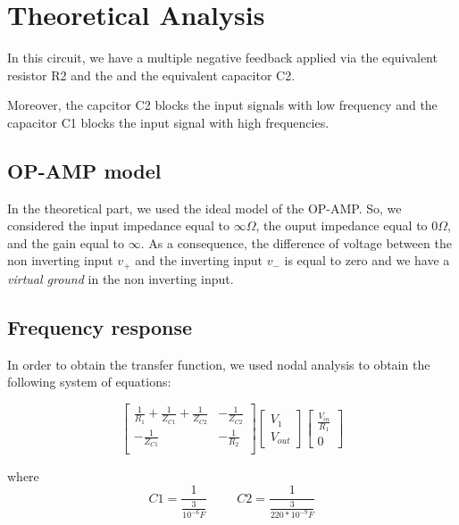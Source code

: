\section{Theoretical Analysis}
\label{sec:analysis}

In this circuit, we have a multiple negative feedback applied via the equivalent resistor R2 and the
and the equivalent capacitor C2.

Moreover, the capcitor C2 blocks the input signals with low frequency and the capacitor C1
blocks the input signal with high frequencies.

\subsection{OP-AMP model}

In the theoretical part, we used the ideal model of the OP-AMP. So, we considered the input impedance equal to $\infty \Omega$, the ouput impedance
equal to $0 \Omega$, and the gain equal to $\infty$. As a consequence, the difference of voltage between the non inverting input $v_{+}$ and the
inverting input $v_{-}$ is equal to zero and we have a \textit{virtual ground} in the non inverting input.


\subsection{Frequency response}

In order to obtain the transfer function, we used nodal analysis to obtain the following system of equations:

\[
  \begin{bmatrix}
    \frac{1}{R_1} + \frac{1}{Z_{C1}} + \frac{1}{Z_{C2}} & -\frac{1}{Z_{C2}} \\
    -\frac{1}{Z_{C1}}                                   & -\frac{1}{R_2}    \\
  \end{bmatrix}
  \begin{bmatrix}
    V_{1} \\ V_{out}
  \end{bmatrix}
  \begin{bmatrix}
    \frac{V_{in}}{R_1} \\ 0
  \end{bmatrix}
\]

\hfill

where
\begin{equation}
  C1 = \frac{1}{\frac{3}{10^{-6} F}} \hspace{1cm} C2 = \frac{1}{\frac{3}{220*10^{-9} F}}
\end{equation}


